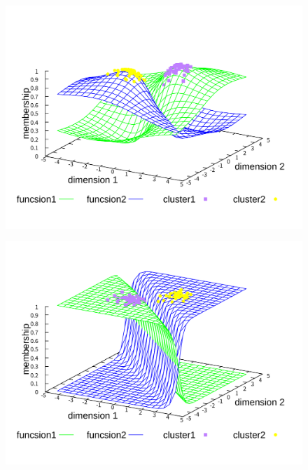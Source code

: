 \documentclass[a4j,12pt,dvipdfmx,oneside]{jsbook}
\theoremstyle{definition}
\begin{document}
\begin{figure}[htbp]
 \centering
 \begin{minipage}{0.43\hsize}
  \includegraphics[width=\linewidth]{qFCMA-Em2-Lambda1.pdf}
  \label{fig:qFCMA-Em2-Lambda1}
 \end{minipage}
 \begin{minipage}{0.43\hsize}
  \includegraphics[width=\linewidth]{qFCMA-Em11-Lambda1.pdf}
  \label{fig:qFCMA-Em11-Lambda1}
 \end{minipage}
 \begin{minipage}{0.43\hsize}

\end{minipage}
\end{figure}
\end{document}
